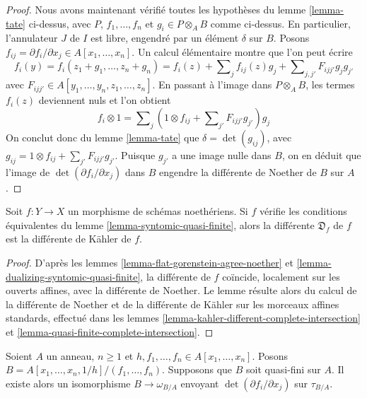 \begin{proof}
\medskip\noindent
Nous avons maintenant vérifié toutes les hypothèses du lemme \ref{lemma-tate}
ci-dessus, avec $P$, $f_1, \ldots, f_n$ et $g_i \in P \otimes_A B$ comme ci-dessus.
En particulier, l'annulateur $J$ de $I$ est libre, engendré par un
élément $\delta$ sur $B$.
Posons $f_{ij} = \partial f_i/\partial x_j \in A[x_1, \ldots, x_n]$.
Un calcul élémentaire montre que l'on peut écrire
$$
f_i(y) =
f_i(z_1 + g_1, \ldots, z_n + g_n) =
f_i(z) + \sum\nolimits_j f_{ij}(z) g_j +
\sum\nolimits_{j, j'} F_{ijj'}g_jg_{j'}
$$
avec $F_{ijj'} \in A[y_1, \ldots, y_n, z_1, \ldots, z_n]$.
En passant à l'image dans $P \otimes_A B$, les termes $f_i(z)$ deviennent
nuls et l'on obtient
$$
f_i \otimes 1 = \sum\nolimits_j
\left(1 \otimes f_{ij} + \sum\nolimits_{j'} F_{ijj'}g_{j'}\right)g_j
$$
On conclut donc du lemme \ref{lemma-tate}
que $\delta = \det(g_{ij})$, avec
$g_{ij} = 1 \otimes f_{ij} + \sum_{j'} F_{ijj'}g_{j'}$.
Puisque $g_{j'}$ a une image nulle dans $B$, on en déduit
que l'image de $\det(\partial f_i/\partial x_j)$ dans $B$
engendre la différente de Noether de $B$ sur $A$.
\end{proof}

\begin{lemma}
\label{lemma-different-syntomic-quasi-finite}
Soit $f : Y \to X$ un morphisme de schémas noethériens. Si $f$
vérifie les conditions équivalentes du lemme \ref{lemma-syntomic-quasi-finite},
alors la différente $\mathfrak{D}_f$ de $f$ est la différente de Kähler
de $f$.
\end{lemma}

\begin{proof}
D'après les lemmes \ref{lemma-flat-gorenstein-agree-noether} et
\ref{lemma-dualizing-syntomic-quasi-finite},
la différente de $f$ coïncide, localement sur les ouverts affines, avec la
différente de Noether. Le lemme résulte alors du
calcul de la différente de Noether et de la différente de Kähler
sur les morceaux affines standards, effectué dans les
lemmes \ref{lemma-kahler-different-complete-intersection} et
\ref{lemma-quasi-finite-complete-intersection}.
\end{proof}

\begin{lemma}
\label{lemma-different-quasi-finite-complete-intersection}
Soient $A$ un anneau, $n \geq 1$ et
$h, f_1, \ldots, f_n \in A[x_1, \ldots, x_n]$.
Posons $B = A[x_1, \ldots, x_n, 1/h]/(f_1, \ldots, f_n)$.
Supposons que $B$ soit quasi-fini sur $A$.
Il existe alors un isomorphisme $B \to \omega_{B/A}$
envoyant $\det(\partial f_i/\partial x_j)$ sur $\tau_{B/A}$.
\end{lemma}

